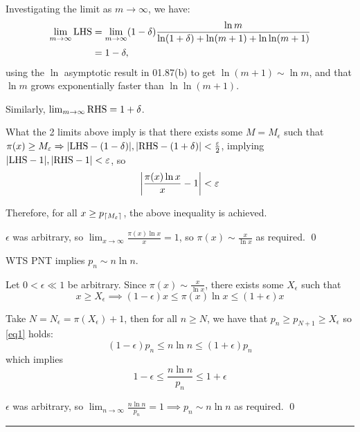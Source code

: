 \documentclass{amsart}
\begin{document}
Investigating the limit as $m \to \infty$, we have:
\begin{align*}
    \lim_{m \to \infty} \lhs &= \lim_{m \to \infty}(1 - \delta) \frac{\ln m}{\ln (1 + \delta) + \ln (m+1) + \ln \ln (m+1)} \\
    &= 1 - \delta,
\end{align*}
using the $\ln$ asymptotic result in 01.87(b) to get $\ln (m+1) \sim \ln m$, and that $\ln m$ grows exponentially faster than $\ln \ln (m+1)$.

Similarly, $\lim_{m \to \infty} \rhs = 1 + \delta$.

What the 2 limits above imply is that there exists some $M = M_\epsilon$ such that $\pi(x) \geq M_\epsilon \implies \abs{\lhs - (1 - \delta)}, \abs{\rhs - (1 + \delta)} < \frac{\epsilon}{2}$, implying $\abs{\lhs - 1}, \abs{\rhs - 1} < \epsilon$, so \begin{equation*}
\abs*{\frac{\pi(x) \ln x}{x} - 1} < \epsilon
\end{equation*}

Therefore, for all $x \geq p_{\ceil{M_\epsilon}}$, the above inequality is achieved.

$\epsilon$ was arbitrary, so $\lim_{x \to \infty} \frac{\pi(x) \ln x}{x} = 1$, so $\pi(x) \sim \frac{x}{\ln x}$ as required. \qed

\pfbwd WTS PNT implies $p_n \sim n \ln n$.

Let $0 < \epsilon \ll 1$ be arbitrary. Since $\pi(x) \sim \frac{x}{\ln x}$, there exists some $X_\epsilon$ such that \begin{equation} \label{eq1}
x \geq X_\epsilon \implies (1-\epsilon) x \leq \pi(x) \ln x \leq (1 + \epsilon)x
\end{equation}

Take $N = N_\epsilon = \pi(X_\epsilon) + 1$, then for all $n \geq N$, we have that $p_n \geq p_{N + 1} \geq X_\epsilon$ so \eqref{eq1} holds:
\begin{equation*}
(1-\epsilon) p_n \leq n \ln n \leq (1 + \epsilon) p_n
\end{equation*}
which implies
\begin{equation*}
1 - \epsilon \leq \frac{n \ln n}{p_n} \leq 1 + \epsilon
\end{equation*}

$\epsilon$ was arbitrary, so $\lim_{n \to \infty} \frac{n \ln n}{p_n} = 1 \implies p_n \sim n \ln n$ as required. \qed

\bigskip\hrule

\vspace{0.5cm}
\end{document}
